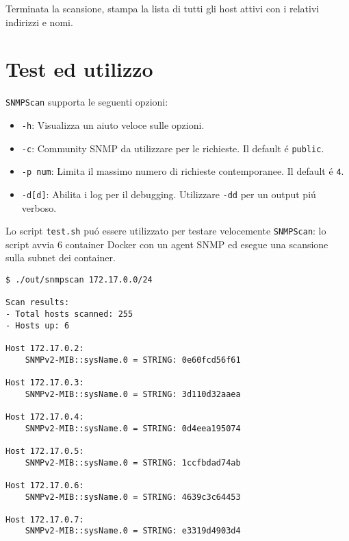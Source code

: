 \documentclass{article}
\providecommand{\inlinecode}[1]{\texttt{#1}}
\begin{document}
Terminata la scansione, stampa la lista di tutti gli host attivi con i relativi indirizzi e nomi.



\section{Test ed utilizzo}

\inlinecode{SNMPScan} supporta le seguenti opzioni:

\begin{itemize}
\item \inlinecode{-h}: Visualizza un aiuto veloce sulle opzioni.
\item \inlinecode{-c}: Community SNMP da utilizzare per le richieste.
      Il default \'{e} \inlinecode{public}.
\item \inlinecode{-p num}: Limita il massimo numero di richieste contemporanee.
      Il default \'{e} \inlinecode{4}.
\item \inlinecode{-d[d]}: Abilita i log per il debugging.
      Utilizzare \inlinecode{-dd} per un output pi\'{u} verboso.
\end{itemize}

Lo script \inlinecode{test.sh} pu\'{o} essere utilizzato per testare velocemente \inlinecode{SNMPScan}:
lo script avvia 6 container Docker con un agent SNMP ed esegue una scansione sulla subnet dei container.

\begin{lstlisting}
$ ./out/snmpscan 172.17.0.0/24

Scan results:
- Total hosts scanned: 255
- Hosts up: 6

Host 172.17.0.2:
    SNMPv2-MIB::sysName.0 = STRING: 0e60fcd56f61

Host 172.17.0.3:
    SNMPv2-MIB::sysName.0 = STRING: 3d110d32aaea

Host 172.17.0.4:
    SNMPv2-MIB::sysName.0 = STRING: 0d4eea195074

Host 172.17.0.5:
    SNMPv2-MIB::sysName.0 = STRING: 1ccfbdad74ab

Host 172.17.0.6:
    SNMPv2-MIB::sysName.0 = STRING: 4639c3c64453

Host 172.17.0.7:
    SNMPv2-MIB::sysName.0 = STRING: e3319d4903d4
\end{lstlisting}
\end{document}
